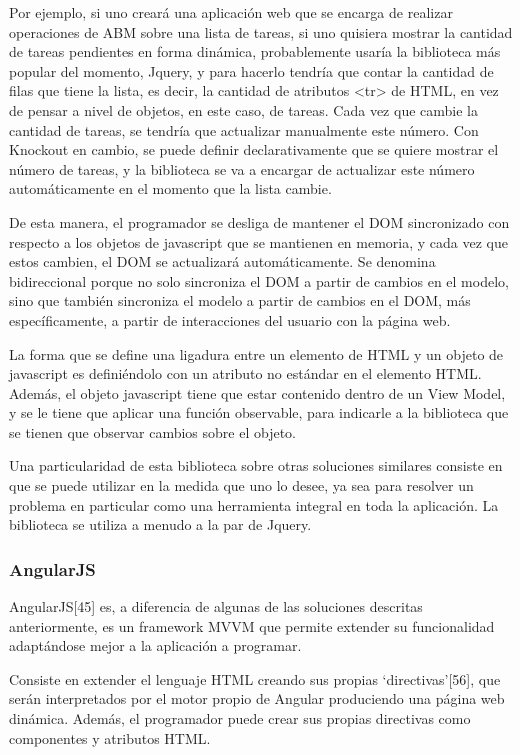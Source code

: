 \documentclass[doc,helv,longtable]{article}
\begin{document}
Por ejemplo, si uno creará una aplicación web que se encarga de realizar operaciones de ABM sobre una lista de tareas, si uno quisiera mostrar la cantidad de tareas pendientes en forma dinámica, probablemente usaría la biblioteca más popular del momento, Jquery, y para hacerlo tendría que contar la cantidad de filas que tiene la lista, es decir, la cantidad de atributos <tr> de HTML, en vez de pensar a nivel de objetos, en este caso, de tareas. Cada vez que cambie la cantidad de tareas, se tendría que actualizar manualmente este número. Con Knockout en cambio, se puede definir declarativamente que se quiere mostrar el número de tareas, y la biblioteca se va a encargar de actualizar este número automáticamente en el momento que la lista cambie. 

De esta manera, el programador se desliga de mantener el DOM sincronizado con respecto a los objetos de javascript que se mantienen en memoria, y cada vez que estos cambien, el DOM se actualizará automáticamente. Se denomina bidireccional porque no solo sincroniza el DOM a partir de cambios en el modelo, sino que también sincroniza el modelo a partir de cambios en el DOM, más específicamente, a partir de interacciones del usuario con la página web. 

La forma que se define una ligadura entre un elemento de HTML y un objeto de javascript es definiéndolo con un atributo no estándar en el elemento HTML. Además, el objeto javascript tiene que estar contenido dentro de un View Model, y se le tiene que aplicar una función observable, para indicarle a la biblioteca que se tienen que observar cambios sobre el objeto.

Una particularidad de esta biblioteca sobre otras soluciones similares consiste en que se puede utilizar en la medida que uno lo desee, ya sea para resolver un problema en particular como una herramienta integral en toda la aplicación. La biblioteca se utiliza a menudo a la par de Jquery. \subsubsection{AngularJS}


AngularJS[45] es, a diferencia de algunas de las soluciones descritas anteriormente, es un framework MVVM que permite extender su funcionalidad adaptándose mejor a la aplicación a programar. 

Consiste en extender el lenguaje HTML creando sus propias ‘directivas’[56], que serán interpretados por el motor propio de Angular produciendo una página web dinámica. Además, el programador puede crear sus propias directivas como componentes y atributos HTML.
\end{document}
